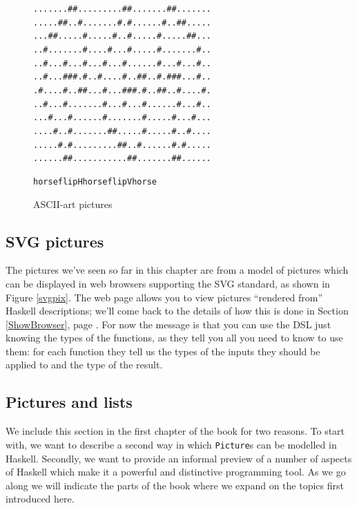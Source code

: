 \begin{figure}[t]
\begin{center}
\begin{alltt} 
.......##...               ......##....               ...##.......
.....##..#..               .....#.#....               ..#..##.....
...##.....#.               ....#..#....               .#.....##...
..#.......#.               ...#...#....               .#.......#..
..#...#...#.               ..#...#.....               .#...#...#..
..#...###.#.               .#....#..##.               .#.###...#..
.#....#..##.               ..#...###.#.               .##..#....#.
..#...#.....               ..#...#...#.               .....#...#..
...#...#....               ..#.......#.               ....#...#...
....#..#....               ...##.....#.               ....#..#....
.....#.#....               .....##..#..               ....#.#.....
......##....               .......##...               ....##......

horse                      flipH horse                flipV horse
\end{alltt}
\end{center}
\caption{ASCII-art pictures}
\label{Horses}
\end{figure}


\subsection*{SVG pictures}

The pictures we've seen so far in this chapter are from a model of pictures which can be displayed in web browsers supporting the SVG standard\cite{SVG}, as shown in Figure \ref{svgpix}. The web page allows you to view pictures ``rendered from'' Haskell descriptions; we'll come back to the details of how this is done in Section \ref{ShowBrowser}, page \pageref{ShowBrowser}. For now the message is that you can use the DSL just knowing the types of the functions, as they tell you all you need to know to use them: for each function they tell us the types of the inputs they should be applied to and the type of the result.

\subsection*{Pictures and lists}


We include this section in the first chapter of the book for two reasons.
To start with, we want to describe a second way in which \texttt{Picture}s can be 
modelled in Haskell. 
Secondly, we want to provide an
informal preview of a number of aspects of Haskell which make it
a powerful and distinctive
programming tool. As we go along we will indicate
the parts of the book where we expand on
the topics first introduced here.

